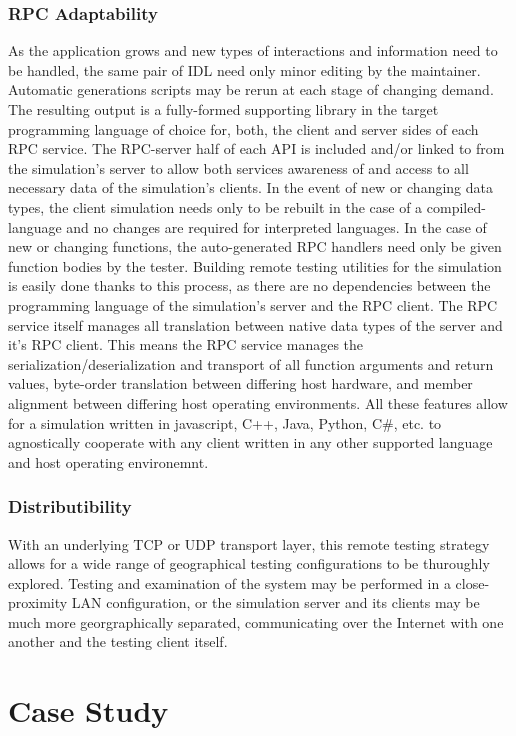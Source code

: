 \documentclass[conference]{IEEEtran}
\begin{document}
\subsubsection{RPC Adaptability}As the application grows and new types of interactions and information need to be handled, the same pair of IDL need only minor editing by the maintainer. Automatic generations scripts may be rerun at each stage of changing demand. The resulting output is a fully-formed supporting library in the target programming language of choice for, both, the client and server sides of each RPC service. The RPC-server half of each API is included and/or linked to from the simulation's server to allow both services awareness of and access to all necessary data of the simulation's clients. In the event of new or changing data types, the client simulation needs only to be rebuilt in the case of a compiled-language and no changes are required for interpreted languages. In the case of new or changing functions, the auto-generated RPC handlers need only be given function bodies by the tester. Building remote testing utilities for the simulation is easily done thanks to this process, as there are no dependencies between the programming language of the simulation's server and the RPC client. The RPC service itself manages all translation between native data types of the server and it's RPC client. This means the RPC service manages the serialization/deserialization and transport of all function arguments and return values, byte-order translation between differing host hardware, and member alignment between differing host operating environments. All these features allow for a simulation written in javascript, C++, Java, Python, C\#, etc. to agnostically cooperate with any client written in any other supported language and host operating environemnt.
\subsubsection{Distributibility}With an underlying TCP or UDP transport layer, this remote testing strategy allows for a wide range of geographical testing configurations to be thuroughly explored. Testing and examination of the system may be performed in a close-proximity LAN configuration, or the simulation server and its clients may be much more georgraphically separated, communicating over the Internet with one another and the testing client itself.


\section{Case Study}
\end{document}
